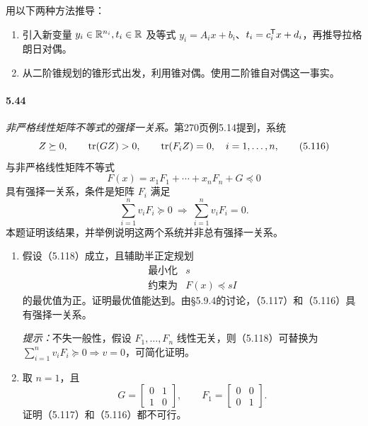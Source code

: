 用以下两种方法推导：
\begin{enumerate}[label=(\alph*)]
\item 引入新变量 $y_i\in\mathbb R^{n_i},t_i\in\mathbb R$ 及等式 $y_i=A_ix+b_i$、$t_i=c_i^\mathsf T x+d_i$，再推导拉格朗日对偶。
\item 从二阶锥规划的锥形式出发，利用锥对偶。使用二阶锥自对偶这一事实。
\end{enumerate}

\paragraph{5.44} \emph{非严格线性矩阵不等式的强择一关系。}第270页例5.14提到，系统
\begin{equation}
Z\succeq0,\qquad\operatorname{tr}(GZ)>0,\qquad
\operatorname{tr}(F_iZ)=0,\quad i=1,\ldots,n,\tag{5.116}
\end{equation}
与非严格线性矩阵不等式
\begin{equation}
F(x)=x_1F_1+\cdots+x_nF_n+G\preceq0\tag{5.117}
\end{equation}
具有强择一关系，条件是矩阵 $F_i$ 满足
\begin{equation}
\sum_{i=1}^n v_iF_i\succeq0\ \Longrightarrow\
\sum_{i=1}^n v_iF_i=0.\tag{5.118}
\end{equation}
本题证明该结果，并举例说明这两个系统并非总有强择一关系。
\begin{enumerate}[label=(\alph*)]
\item 假设（5.118）成立，且辅助半正定规划
\[
\begin{array}{ll}\text{最小化}&s\\
\text{约束为}&F(x)\preceq sI\end{array}
\]
的最优值为正。证明最优值能达到。由§5.9.4的讨论，（5.117）和（5.116）具有强择一关系。

\emph{提示：}不失一般性，假设 $F_1,\ldots,F_n$ 线性无关，则（5.118）可替换为 $\sum_{i=1}^n v_iF_i\succeq0\Longrightarrow v=0$，可简化证明。
\item 取 $n=1$，且
\[
G=\begin{bmatrix}0&1\\1&0\end{bmatrix},\qquad
F_1=\begin{bmatrix}0&0\\0&1\end{bmatrix}.
\]
证明（5.117）和（5.116）都不可行。
\end{enumerate}


